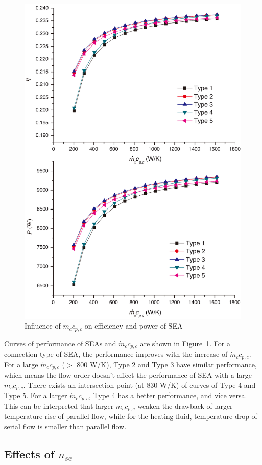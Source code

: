 \noindent \begin{figure}[htbp]
\begin{center}
	\includegraphics[width = 0.7\columnwidth]{fig/qm_ccp_c}
	\caption{Influence of $\dot{m}_cc_{p,c}$ on efficiency and power of SEA}
	\label{fig:qm_ccp_c}
\end{center}
\end{figure}

Curves of performance of SEAs and $\dot{m}_cc_{p,c}$ are shown in Figure~\ref{fig:qm_ccp_c}. For a connection type of SEA, the performance improves with the increase of $\dot{m}_cc_{p,c}$. For a large $\dot{m}_cc_{p,c}$ ($>$ 800 W/K), Type 2 and Type 3 have similar performance, which means the flow order doesn't affect the performance of SEA with a large $\dot{m}_cc_{p,c}$. There exists an intersection point (at 830 W/K) of curves of Type 4 and Type 5. For a larger $\dot{m}_cc_{p,c}$, Type 4 has a better performance, and vice versa. This can be interpreted that larger $\dot{m}_cc_{p,c}$ weaken the drawback of larger temperature rise of parallel flow, while for the heating fluid, temperature drop of serial flow is smaller than parallel flow.

\subsection{Effects of $n_{se}$}

